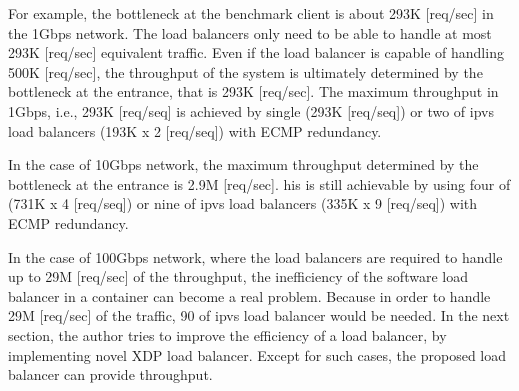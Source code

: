 For example, the bottleneck at the benchmark client is about 293K [req/sec] in the 1Gbps network. 
The load balancers only need to be able to handle at most 293K [req/sec] equivalent  traffic.
Even if the load balancer is capable of handling 500K [req/sec], the throughput of the system is ultimately determined by the bottleneck at the entrance, that is 293K [req/sec].
The maximum throughput in 1Gbps, i.e., 293K [req/seq] is  achieved by single  (293K [req/seq]) or two of ipvs load balancers (193K x 2 [req/seq]) with ECMP redundancy.

In the case of 10Gbps network, the maximum throughput determined by the bottleneck at the entrance is 2.9M [req/sec].
his is still  achievable  by using four of  (731K x 4 [req/seq]) or nine of ipvs load balancers (335K x 9 [req/seq]) with ECMP redundancy.

In the case of 100Gbps network, where the load balancers are required to handle up to 29M [req/sec] of the throughput, the inefficiency of the software load balancer in a container can become a real problem.
Because in order to handle 29M [req/sec] of the traffic, 90 of ipvs load balancer would be needed.
In the next section, the author tries to improve the efficiency of a load balancer, by implementing novel XDP load balancer.
Except for such cases, the proposed load balancer can provide  throughput.


